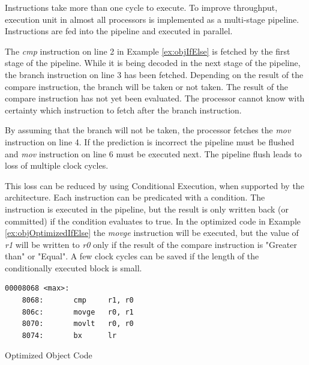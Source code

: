 Instructions take more than one cycle to execute. To improve throughput, execution unit in almost all processors is implemented as a multi-stage pipeline. Instructions are fed into the pipeline and executed in parallel.

The \emph{cmp} instruction on line 2 in Example \ref{ex:objIfElse} is fetched by the first stage of the pipeline. While it is being decoded in the next stage of the pipeline, the branch instruction on line 3 has been fetched. Depending on the result of the compare instruction, the branch will be taken or not taken. The result of the compare instruction has not yet been evaluated. The processor cannot know with certainty which instruction to fetch after the branch instruction.

By assuming that the branch will not be taken, the processor fetches the \emph{mov} instruction on line 4. If the prediction is incorrect the pipeline must be flushed and \emph{mov} instruction on line 6 must be executed next. The pipeline flush leads to loss of multiple clock cycles.

This loss can be reduced by using Conditional Execution, when supported by the architecture. Each instruction can be predicated with a condition. The instruction is executed in the pipeline, but the result is only written back (or committed) if the condition evaluates to true. In the optimized code in Example \ref{ex:objOptimizedIfElse} the \emph{movge} instruction will be executed, but the value of \emph{r1} will be written to \emph{r0} only if the result of the compare instruction is "Greater than" or "Equal". A few clock cycles can be saved if the length of the conditionally executed block is small.

\begin{Example}[h]
\begin{lstlisting}
00008068 <max>:
    8068:       cmp     r1, r0
    806c:       movge   r0, r1
    8070:       movlt   r0, r0
    8074:       bx      lr
\end{lstlisting}
\caption{Optimized Object Code}
\label{ex:objOptimizedIfElse}
\end{Example}

